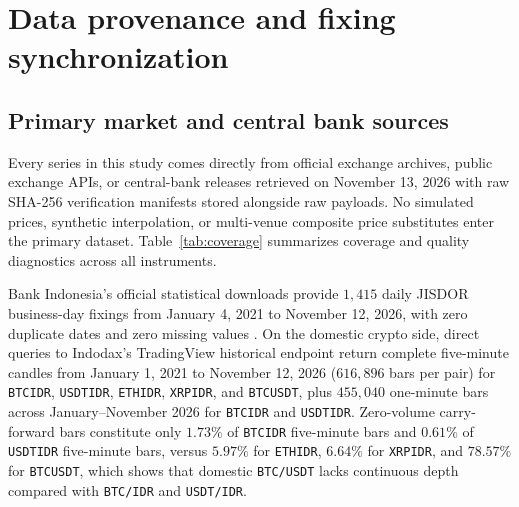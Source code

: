 \section{Data provenance and fixing synchronization}
\label{sec:data}

\subsection{Primary market and central bank sources}
Every series in this study comes directly from official exchange archives, public exchange APIs, or central-bank releases retrieved on November 13, 2026 with raw SHA-256 verification manifests stored alongside raw payloads. No simulated prices, synthetic interpolation, or multi-venue composite price substitutes enter the primary dataset. Table~\ref{tab:coverage} summarizes coverage and quality diagnostics across all instruments.

Bank Indonesia's official statistical downloads provide $1,415$ daily JISDOR business-day fixings from January 4, 2021 to November 12, 2026, with zero duplicate dates and zero missing values \citep{bi_sp233021,bi_padg072026}. On the domestic crypto side, direct queries to Indodax's TradingView historical endpoint return complete five-minute candles from January 1, 2021 to November 12, 2026 ($616,896$ bars per pair) for \texttt{BTCIDR}, \texttt{USDTIDR}, \texttt{ETHIDR}, \texttt{XRPIDR}, and \texttt{BTCUSDT}, plus $455,040$ one-minute bars across January--November 2026 for \texttt{BTCIDR} and \texttt{USDTIDR}. Zero-volume carry-forward bars constitute only $1.73\%$ of \texttt{BTCIDR} five-minute bars and $0.61\%$ of \texttt{USDTIDR} five-minute bars, versus $5.97\%$ for \texttt{ETHIDR}, $6.64\%$ for \texttt{XRPIDR}, and $78.57\%$ for \texttt{BTCUSDT}, which shows that domestic \texttt{BTC/USDT} lacks continuous depth compared with \texttt{BTC/IDR} and \texttt{USDT/IDR}.

